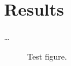 
\chapter{Results}
\label{cha:results}
\ldots

\begin{sidewaysfigure}
\begin{center}
    
    \caption{Test figure.}
    \label{fig:results_histograms}
\end{center}
\end{sidewaysfigure}
